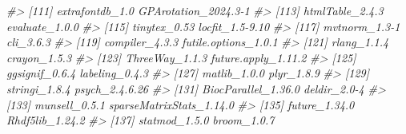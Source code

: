 \documentclass[]{article}
\newcommand{\hlcom}[1]{\textcolor[rgb]{0.502,0.502,0.502}{\textit{#1}}}%
\newenvironment{Shaded}{\begin{myshaded}}{\end{myshaded}}
\newcommand{\CommentTok}[1]{\hlcom{#1}}
\begin{document}
\begin{Shaded}
\begin{Highlighting}[]
\CommentTok{\#\textgreater{} [111] extrafontdb\_1.0           GPArotation\_2024.3{-}1     }
\CommentTok{\#\textgreater{} [113] htmlTable\_2.4.3           evaluate\_1.0.0           }
\CommentTok{\#\textgreater{} [115] tinytex\_0.53              locfit\_1.5{-}9.10          }
\CommentTok{\#\textgreater{} [117] mvtnorm\_1.3{-}1             cli\_3.6.3                }
\CommentTok{\#\textgreater{} [119] compiler\_4.3.3            futile.options\_1.0.1     }
\CommentTok{\#\textgreater{} [121] rlang\_1.1.4               crayon\_1.5.3             }
\CommentTok{\#\textgreater{} [123] ThreeWay\_1.1.3            future.apply\_1.11.2      }
\CommentTok{\#\textgreater{} [125] ggsignif\_0.6.4            labeling\_0.4.3           }
\CommentTok{\#\textgreater{} [127] matlib\_1.0.0              plyr\_1.8.9               }
\CommentTok{\#\textgreater{} [129] stringi\_1.8.4             psych\_2.4.6.26           }
\CommentTok{\#\textgreater{} [131] BiocParallel\_1.36.0       deldir\_2.0{-}4             }
\CommentTok{\#\textgreater{} [133] munsell\_0.5.1             sparseMatrixStats\_1.14.0 }
\CommentTok{\#\textgreater{} [135] future\_1.34.0             Rhdf5lib\_1.24.2          }
\CommentTok{\#\textgreater{} [137] statmod\_1.5.0             broom\_1.0.7}
\end{Highlighting}
\end{Shaded}
\end{document}
